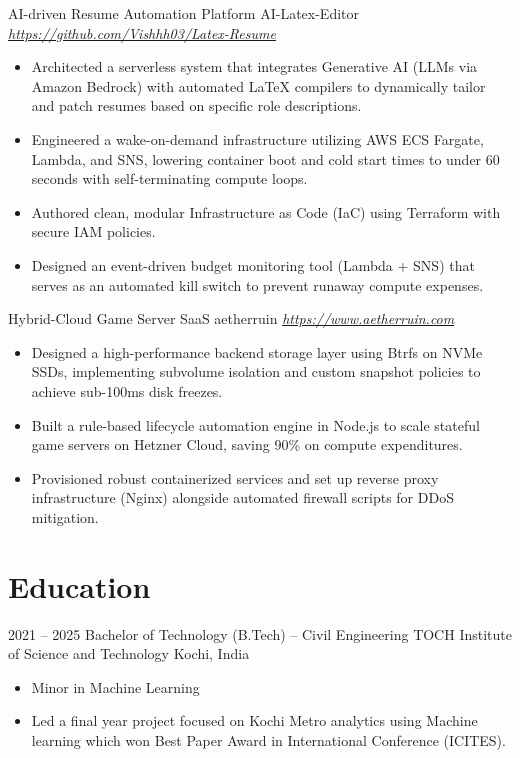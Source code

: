 \documentclass[10pt, a4paper, sans]{moderncv}
\begin{document}
\cventry
  {}
  {AI-driven Resume Automation Platform}
  {AI-Latex-Editor}
  {\textit{\url{https://github.com/Vishhh03/Latex-Resume}}}
  {}
  {
  \begin{itemize}\setlength{\itemsep}{2pt}
    \item Architected a serverless system that integrates Generative AI (LLMs via Amazon Bedrock) with automated LaTeX compilers to dynamically tailor and patch resumes based on specific role descriptions.
    \item Engineered a wake-on-demand infrastructure utilizing AWS ECS Fargate, Lambda, and SNS, lowering container boot and cold start times to under 60 seconds with self-terminating compute loops.
    \item Authored clean, modular Infrastructure as Code (IaC) using Terraform with secure IAM policies.
    \item Designed an event-driven budget monitoring tool (Lambda + SNS) that serves as an automated kill switch to prevent runaway compute expenses.
  \end{itemize}
  }

\vspace{1mm}

\cventry
  {}
  {Hybrid-Cloud Game Server SaaS}
  {aetherruin}
  {\textit{\url{https://www.aetherruin.com}}}
  {}
  {
  \begin{itemize}\setlength{\itemsep}{2pt}
    \item Designed a high-performance backend storage layer using Btrfs on NVMe SSDs, implementing subvolume isolation and custom snapshot policies to achieve sub-100ms disk freezes.
    \item Built a rule-based lifecycle automation engine in Node.js to scale stateful game servers on Hetzner Cloud, saving 90\% on compute expenditures.
    \item Provisioned robust containerized services and set up reverse proxy infrastructure (Nginx) alongside automated firewall scripts for DDoS mitigation.
  \end{itemize}
  }

\section{Education}

\cventry
  {2021 -- 2025}
  {Bachelor of Technology (B.Tech) -- Civil Engineering}
  {TOCH Institute of Science and Technology}
  {Kochi, India}
  {}
  {
  \begin{itemize}\setlength{\itemsep}{2pt}
    \item Minor in Machine Learning
    \item Led a final year project focused on Kochi Metro analytics using Machine learning which won Best Paper Award in International Conference (ICITES).
  \end{itemize}
  }
\end{document}
